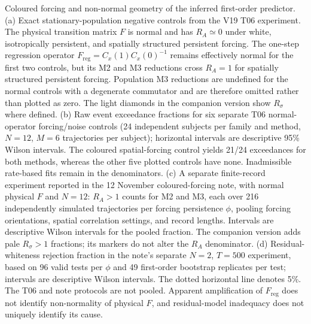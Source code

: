 \caption{Coloured forcing and non-normal geometry of the inferred first-order predictor. (a) Exact stationary-population negative controls from the V19 T06 experiment. The physical transition matrix $F$ is normal and has $R_A\simeq0$ under white, isotropically persistent, and spatially structured persistent forcing. The one-step regression operator $F_{\mathrm{reg}}=C_x(1)C_x(0)^{-1}$ remains effectively normal for the first two controls, but its M2 and M3 reductions cross $R_A=1$ for spatially structured persistent forcing. Population M3 reductions are undefined for the normal controls with a degenerate commutator and are therefore omitted rather than plotted as zero. The light diamonds in the companion version show $R_\sigma$ where defined. (b) Raw event exceedance fractions for six separate T06 normal-operator forcing/noise controls (24 independent subjects per family and method, $N=12$, $M=6$ trajectories per subject); horizontal intervals are descriptive 95\% Wilson intervals. The coloured spatial-forcing control yields 21/24 exceedances for both methods, whereas the other five plotted controls have none. Inadmissible rate-based fits remain in the denominators. (c) A separate finite-record experiment reported in the 12 November coloured-forcing note, with normal physical $F$ and $N=12$: $R_A>1$ counts for M2 and M3, each over 216 independently simulated trajectories per forcing persistence $\phi$, pooling forcing orientations, spatial correlation settings, and record lengths. Intervals are descriptive Wilson intervals for the pooled fraction. The companion version adds pale $R_\sigma>1$ fractions; its markers do not alter the $R_A$ denominator. (d) Residual-whiteness rejection fraction in the note's separate $N=2$, $T=500$ experiment, based on 96 valid tests per $\phi$ and 49 first-order bootstrap replicates per test; intervals are descriptive Wilson intervals. The dotted horizontal line denotes 5\%. The T06 and note protocols are not pooled. Apparent amplification of $F_{\mathrm{reg}}$ does not identify non-normality of physical $F$, and residual-model inadequacy does not uniquely identify its cause.}\label{fig:coloured-forcing-controls}
